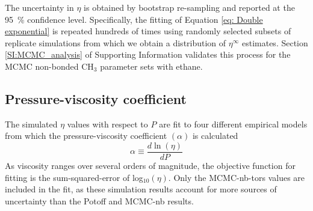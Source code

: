 \documentclass[preprint,review,12pt]{elsarticle}
\begin{document}
	The uncertainty in $\eta$ is obtained by bootstrap re-sampling and reported at the 95~\% confidence level. Specifically, the fitting of Equation \ref{eq: Double exponential} is repeated hundreds of times using randomly selected subsets of replicate simulations from which we obtain a distribution of $\eta^{\infty}$ estimates. Section \ref{SI:MCMC_analysis} of Supporting Information validates this process for the MCMC non-bonded CH$_3$ parameter sets with ethane. 
		
%	
	
	
	\subsection{Pressure-viscosity coefficient} \label{Pressure-viscosity coefficient}
	
    The simulated $\eta$ values with respect to $P$ are fit to four different empirical models from which the pressure-viscosity coefficient $(\alpha)$ is calculated
    \begin{equation}
    \alpha \equiv \frac{d\ln(\eta)}{dP}
    \end{equation}
    As viscosity ranges over several orders of magnitude, the objective function for fitting is the sum-squared-error of log$_{10}(\eta)$. Only the MCMC-nb-tors values are included in the fit, as these simulation results account for more sources of uncertainty than the Potoff and MCMC-nb results. 
    
\end{document}

